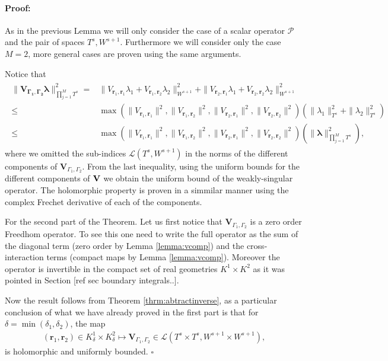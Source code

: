 \documentclass{article}
\newenvironment{proof}{\paragraph{Proof:}}{\hfill$\square$}
\newcommand{\todo}[1]{{\color{red}[#1]}}
\newcommand{\cP}{\mathcal{P}}
\newcommand{\bla}{\boldsymbol \lambda}
\newcommand{\br}{\bm{r}}
\begin{document}
\begin{proof}
As in the previous Lemma we will only consider the case of a scalar operator $\cP$ and the pair of spaces $T^s,W^{s+1}$. Furthermore we will consider only the case $M=2$, more general cases are proven using the same arguments. 

Notice that 
\begin{align*}
\begin{split}
\| \mathbf{V_{\Gamma_1,\Gamma_2}}\bla\|^2_{\prod_{j=1}^M T^s} =& \| V_{\br_1,\br_1} \lambda_1 + V_{\br_1,\br_2} \lambda_2 \|^2_{W^{s+1}}+
\| V_{\br_2,\br_1} \lambda_1 + V_{\br_2,\br_2} \lambda_2 \|^2_{W^{s+1}} \\
\leq& \max(\|V_{\br_1,\br_1} \|^2 ,\|V_{\br_1,\br_2} \|^2,\|V_{\br_2,\br_1} \|^2,\|V_{\br_2,\br_2} \|^2 ) (\|\lambda_1\|^2_{T^s}+ \|\lambda_2\|_{T^s}^2)\\
\leq& \max(\|V_{\br_1,\br_1} \|^2 ,\|V_{\br_1,\br_2} \|^2,\|V_{\br_2,\br_1} \|^2,\|V_{\br_2,\br_2} \|^2 ) (\| \bla\|^2_{\prod_{j=1}^M T^s}),
\end{split}
\end{align*}
where we omitted the sub-indices $\mathcal{L}(T^s,W^{s+1})$ in the norms of the different components of $\mathbf{V}_{\Gamma_1,\Gamma_2}$. From the last inequality, using the uniform bounds for the different components of $\bf{V}$ we obtain the uniform bound of the weakly-singular operator. The holomorphic property is proven in a simmilar manner using the complex Frechet derivative of each of the components. 

For the second part of the Theorem. Let us first notice that $\mathbf{V}_{\Gamma_1,\Gamma_2}$ is a zero order Freedhom operator. To see this one need to write the full operator as the sum of the diagonal term (zero order by Lemma \ref{lemma:vcomp}) and the cross-interaction terms (compact maps by Lemma \ref{lemma:vcomp}). Moreover the operator is invertible in the compact set of real geometries $K^1 \times K^2$ as it was pointed in Section \todo{ref sec boundary integrals..}. 

Now the result follows from Theorem \ref{thrm:abtractinverse}, as a particular conclusion of what we have already proved in the first part is that for $\delta = \min(\delta_1,\delta_2)$,  the map 
\begin{align*}
(\br_1,\br_2) \in K^1_\delta \times K^2_\delta \mapsto \mathbf{V}_{\Gamma_1,\Gamma_2} \in \mathcal{L}(T^s\times T^s, W^{s+1} \times W^{s+1}),
\end{align*}
is holomorphic and uniformly bounded. 
\end{proof}
\end{document}
